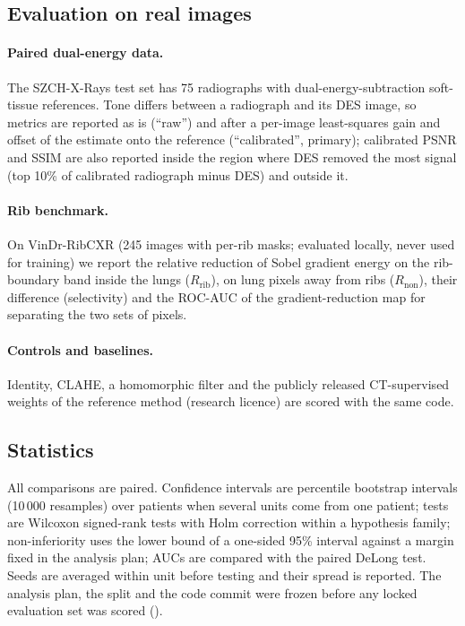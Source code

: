 \subsection{Evaluation on real images}
\paragraph{Paired dual-energy data.} The SZCH-X-Rays test set has 75 radiographs with dual-energy-subtraction soft-tissue references.
Tone differs between a radiograph and its DES image, so metrics are reported as is (``raw'') and after a per-image least-squares gain and offset of the estimate
onto the reference (``calibrated'', primary); calibrated PSNR and SSIM are also reported inside the region where DES removed the most signal
(top 10\% of calibrated radiograph minus DES) and outside it.
\paragraph{Rib benchmark.} On VinDr-RibCXR (245 images with per-rib masks; evaluated locally, never used for training) we report the relative reduction of Sobel
gradient energy on the rib-boundary band inside the lungs ($R_\mathrm{rib}$), on lung pixels away from ribs ($R_\mathrm{non}$), their difference (selectivity)
and the ROC-AUC of the gradient-reduction map for separating the two sets of pixels.
\paragraph{Controls and baselines.} Identity, CLAHE, a homomorphic filter and the publicly released CT-supervised weights of the reference method
(research licence) are scored with the same code.

\subsection{Statistics}
All comparisons are paired. Confidence intervals are percentile bootstrap intervals (10\,000 resamples) over patients when several units come from one patient;
tests are Wilcoxon signed-rank tests with Holm correction within a hypothesis family; non-inferiority uses the lower bound of a one-sided 95\% interval against a
margin fixed in the analysis plan; AUCs are compared with the paired DeLong test. Seeds are averaged within unit before testing and their spread is reported.
The analysis plan, the split and the code commit were frozen before any locked evaluation set was scored ().
